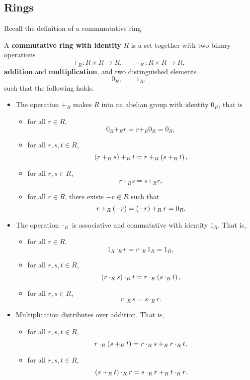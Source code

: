 \subsection{Rings}

Recall the definition of a commmutative ring.

\begin{definition}
A \textbf{commutative ring with identity} $ R $ is a set together with two binary operations
$$ +_R : R \times R \to R, \qquad \cdot_R : R \times R \to R, $$
\textbf{addition} and \textbf{multiplication}, and two distinguished elements
$$ 0_R, \qquad 1_R, $$
such that the following holds.
\begin{itemize}
\item The operation $ +_R $ makes $ R $ into an abelian group with identity $ 0_R $, that is
\begin{itemize}
\item for all $ r \in R $,
$$ 0_R +_R r = r +_R 0_R = 0_R, $$
\item for all $ r, s, t \in R $,
$$ \left( r +_R s \right) +_R t = r +_R \left( s +_R t \right), $$
\item for all $ r, s \in R $,
$$ r +_R s = s +_R r, $$
\item for all $ r \in R $, there exists $ -r \in R $ such that
$$ r +_R \left( -r \right) = \left( -r \right) +_R r = 0_R. $$
\end{itemize}
\item The operation $ \cdot_R $ is associative and commutative with identity $ 1_R $. That is,
\begin{itemize}
\item for all $ r \in R $,
$$ 1_R \cdot_R r = r \cdot_R 1_R = 1_R, $$
\item for all $ r, s, t \in R $,
$$ \left( r \cdot_R s \right) \cdot_R t = r \cdot_R \left( s \cdot_R t \right), $$
\item for all $ r, s \in R $,
$$ r \cdot_R s = s \cdot_R r. $$
\end{itemize}
\item Multiplication distributes over addition. That is,
\begin{itemize}
\item for all $ r, s, t \in R $,
$$ r \cdot_R \left( s +_R t \right) = r \cdot_R s +_R r \cdot_R t, $$
\item for all $ r, s, t \in R $,
$$ \left( s +_R t \right) \cdot_R r = s \cdot_R r +_R t \cdot_R r. $$
\end{itemize}
\end{itemize}
\end{definition}

